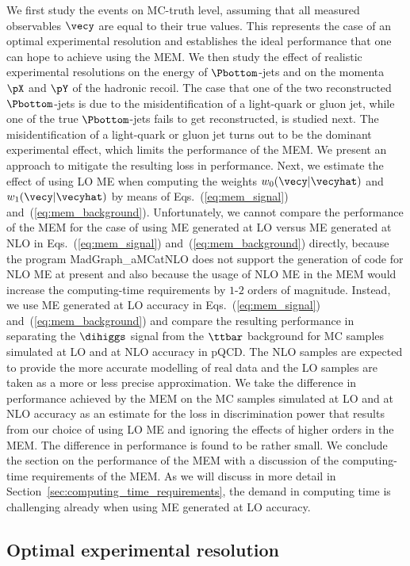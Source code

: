We first study the events on MC-truth level, assuming that all measured observables $\vecy$ are equal to their true values.
This represents the case of an optimal experimental resolution and establishes the ideal performance that one can hope to achieve using the MEM.
We then study the effect of realistic experimental resolutions on the energy of $\Pbottom$-jets and on the momenta $\pX$ and $\pY$ of the hadronic recoil.
The case that one of the two reconstructed $\Pbottom$-jets is due to the misidentification of a light-quark or gluon jet,
while one of the true $\Pbottom$-jets fails to get reconstructed, is studied next.
The misidentification of a light-quark or gluon jet turns out to be the dominant experimental effect,
which limits the performance of the MEM.
We present an approach to mitigate the resulting loss in performance.
Next, we estimate the effect of using LO ME when computing the weights $w_{0}(\vecy|\vecyhat)$ and $w_{1}(\vecy|\vecyhat)$ 
by means of Eqs.~(\ref{eq:mem_signal}) and~(\ref{eq:mem_background}).
Unfortunately, we cannot compare the performance of the MEM
for the case of using ME generated at LO versus ME generated at NLO in Eqs.~(\ref{eq:mem_signal}) and~(\ref{eq:mem_background}) directly,
because the program MadGraph\_aMCatNLO does not support the generation of code for NLO ME at present
and also because the usage of NLO ME in the MEM would increase the computing-time requirements by $1$-$2$ orders of magnitude.
Instead, we use ME generated at LO accuracy in Eqs.~(\ref{eq:mem_signal}) and~(\ref{eq:mem_background}) 
and compare the resulting performance in separating the $\dihiggs$ signal from the $\ttbar$ background
for MC samples simulated at LO and at NLO accuracy in pQCD.
The NLO samples are expected to provide the more accurate modelling of real data and the LO samples are taken as a more or less precise approximation.
We take the difference in performance achieved by the MEM on the MC samples simulated at LO and at NLO accuracy
as an estimate for the loss in discrimination power that results from our choice of using LO ME and ignoring the effects of higher orders in the MEM.
The difference in performance is found to be rather small.
We conclude the section on the performance of the MEM with a discussion of the computing-time requirements of the MEM.
As we will discuss in more detail in Section~\ref{sec:computing_time_requirements}, the demand in computing time is challenging already when using ME generated at LO accuracy.


\subsection{Optimal experimental resolution}

